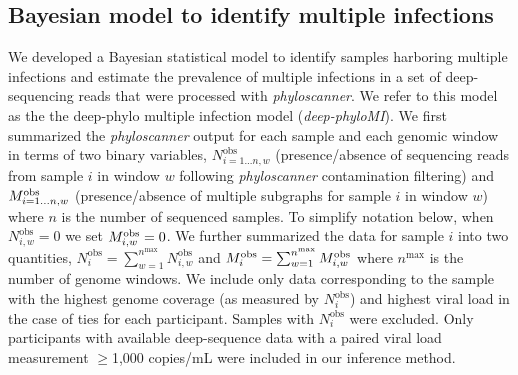 \documentclass[10pt,letterpaper]{article}
\newcommand{\MI}{M^{\text{\text{obs}}}}
\begin{document}
\subsection{Bayesian model to identify multiple infections}
\label{sec:model_methods}
We developed a Bayesian statistical model to identify samples harboring multiple infections and estimate the prevalence of multiple infections in a set of deep-sequencing reads that were processed with \textit{phyloscanner}. We refer to this model as the  the deep-phylo multiple infection model (\textit{deep-phyloMI}). We first summarized the \textit{phyloscanner} output for each sample and each genomic window in terms of two binary variables, $N^{\text{obs}}_{i=1...n,w}$ (presence/absence of sequencing reads from sample $i$ in window $w$ following \textit{phyloscanner} contamination filtering) and $\MI_{i=1...n,w}$ (presence/absence of multiple subgraphs for sample $i$ in window $w$) where $n$ is the number of sequenced samples. To simplify notation below, when $N^{\text{obs}}_{i,w} = 0$ we set $\MI_{i,w} = 0$. We further summarized the data for sample $i$ into two quantities, $N^{\text{obs}}_{i} = \sum_{w=1}^{n^{\text{max}}} N^{\text{obs}}_{i,w}$ and $\MI_i = \sum_{w=1}^{n^{\text{max}}} \MI_{i,w}$ where ${n^{\text{max}}}$ is the number of genome windows. We include only data corresponding to the sample with the highest genome coverage (as measured by $N^\text{obs}_i$) and highest viral load in the case of ties for each participant. Samples with $N^\text{obs}_i$ were excluded. Only participants with available deep-sequence data with a paired viral load measurement $\ge$1,000 copies/mL were included in our inference method. 
\end{document}

